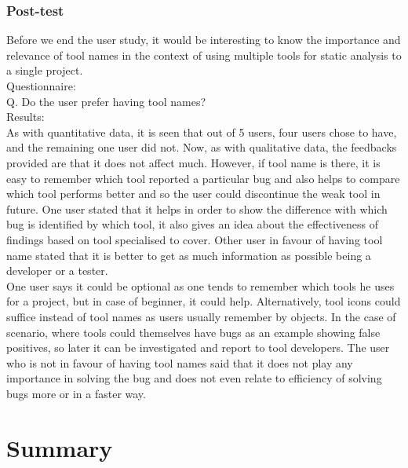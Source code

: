 \subsubsection{Post-test}

Before we end the user study, it would be interesting to know the importance and relevance of tool names in the context of using multiple tools for static analysis to a single project. \\

Questionnaire: \\
 
Q. Do the user prefer having tool names? \\

Results: \\

As with quantitative data, it is seen that out of 5 users, four users chose to have, and the remaining one user did not. Now, as with qualitative data, the feedbacks provided are that it does not affect much. However, if tool name is there, it is easy to remember which tool reported a particular bug and also helps to compare which tool performs better and so the user could discontinue the weak tool in future. One user stated that it helps in order to show the difference with which bug is identified by which tool, it also gives an idea about the effectiveness of findings based on tool specialised to cover. Other user in favour of having tool name stated that it is better to get as much information as possible being a developer or a tester. \\

One user says it could be optional as one tends to remember which tools he uses for a project, but in case of beginner, it could help. Alternatively, tool icons could suffice instead of tool names as users usually remember by objects. In the case of scenario, where tools could themselves have bugs as an example showing false positives, so later it can be investigated and report to tool developers. The user who is not in favour of having tool names said that it does not play any importance in solving the bug and does not even relate to efficiency of solving bugs more or in a faster way. \\ 

\section{Summary}

